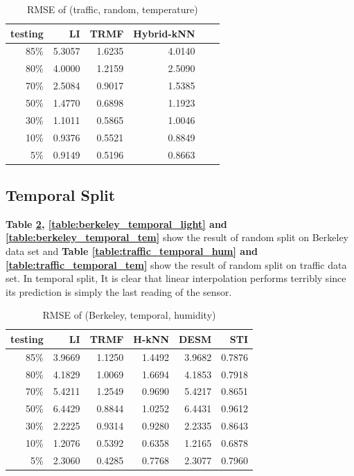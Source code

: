 \begin{table} [htbp]
\centering
\caption{RMSE of (traffic, random, temperature)}
\label{table:traffic_random_tem}
\begin{tabular}{ r | r r r r r}
	testing	&LI	&TRMF	&Hybrid-kNN \\ \hline
	85\%	&5.3057	&1.6235	&4.0140\\ 
	80\%	&4.0000	&1.2159	&2.5090\\
	70\%	&2.5084	&0.9017	&1.5385\\
	50\%	&1.4770	&0.6898	&1.1923\\
	30\%	&1.1011	&0.5865	&1.0046\\
	10\%	&0.9376	&0.5521	&0.8849\\
	 5\%	&0.9149	&0.5196	&0.8663\\
\end{tabular}
\end{table}

\subsection{Temporal Split}
\textbf{Table \ref{table:berkeley_temporal_hum}, \ref{table:berkeley_temporal_light} and \ref{table:berkeley_temporal_tem}} show the result of random split on Berkeley data set and \textbf{Table \ref{table:traffic_temporal_hum} and \ref{table:traffic_temporal_tem}} show the result of random split on traffic data set. In temporal split,  It is clear that linear interpolation performs terribly since its prediction is simply the last reading of the sensor.

\begin{table}[htbp]
\centering
\caption{RMSE of (Berkeley, temporal, humidity)}
\label{table:berkeley_temporal_hum}
\begin{tabular}{ r | r r r r r}
	testing	&LI	&TRMF	&H-kNN	&DESM	&STI\\ \hline
	85\%	&3.9669	&1.1250	&1.4492	&3.9682	&0.7876\\ 
	80\%	&4.1829	&1.0069	&1.6694	&4.1853	&0.7918\\
	70\%	&5.4211	&1.2549	&0.9690	&5.4217	&0.8651\\
	50\%	&6.4429	&0.8844	&1.0252	&6.4431	&0.9612\\
	30\%	&2.2225	&0.9314	&0.9280	&2.2335	&0.8643\\
	10\%	&1.2076	&0.5392	&0.6358	&1.2165	&0.6878\\
	 5\%	&2.3060	&0.4285	&0.7768	&2.3077	&0.7960\\
\end{tabular}
\end{table}

